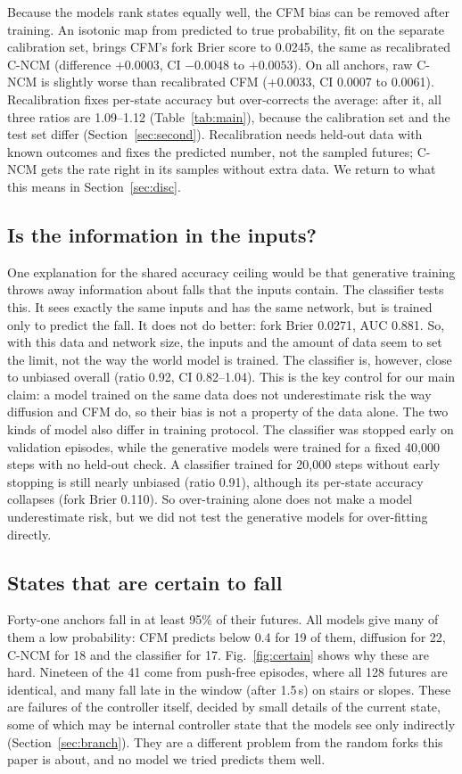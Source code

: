 \documentclass[conference]{IEEEtran}
\newcommand{\cncm}{C-NCM}
\begin{document}
Because the models rank states equally well, the CFM bias can be removed after training.
An isotonic map from predicted to true probability, fit on the separate calibration set,
brings CFM's fork Brier score to 0.0245, the same as recalibrated \cncm{} (difference
+0.0003, CI $-0.0048$ to $+0.0053$). On all anchors, raw \cncm{} is slightly worse than
recalibrated CFM (+0.0033, CI 0.0007 to 0.0061). Recalibration fixes per-state accuracy but
over-corrects the average: after it, all three ratios are 1.09--1.12
(Table~\ref{tab:main}), because the calibration set and the test set differ
(Section~\ref{sec:second}). Recalibration needs held-out data with
known outcomes and fixes the predicted number, not the sampled futures; \cncm{} gets the
rate right in its samples without extra data. We return to what this means in
Section~\ref{sec:disc}.

\subsection{Is the information in the inputs?}
One explanation for the shared accuracy ceiling would be that generative training throws
away information about falls that the inputs contain. The classifier tests this. It sees
exactly the same inputs and has the same network, but is trained only to predict the fall.
It does not do better: fork Brier 0.0271, AUC 0.881. So, with this data and network size,
the inputs and the amount of data seem to set the limit, not the way the world model is
trained. The classifier is, however, close to unbiased overall (ratio 0.92, CI 0.82--1.04).
This is the key control for our main claim: a model trained on the same data does not
underestimate risk the way diffusion and CFM do, so their bias is not a property of the
data alone. The two kinds of model also differ in training protocol. The classifier was
stopped early on validation episodes, while the generative models were trained for a fixed
40,000 steps with no held-out check. A classifier trained for 20,000 steps without early
stopping is still nearly unbiased (ratio 0.91), although its per-state accuracy collapses
(fork Brier 0.110). So over-training alone does not make a model underestimate risk, but we
did not test the generative models for over-fitting directly.

\subsection{States that are certain to fall}
\label{sec:certain}
Forty-one anchors fall in at least 95\% of their futures. All models give many of them a
low probability: CFM predicts below 0.4 for 19 of them, diffusion for 22, \cncm{} for 18
and the classifier for 17. Fig.~\ref{fig:certain} shows why these are hard. Nineteen of
the 41 come from push-free episodes, where all 128 futures are identical, and many fall
late in the window (after 1.5\,s) on stairs or slopes. These are failures of the
controller itself, decided by small details of the current state, some of which may be
internal controller state that the models see only indirectly
(Section~\ref{sec:branch}). They are a different
problem from the random forks this paper is about, and no model we tried predicts them
well.
\end{document}
